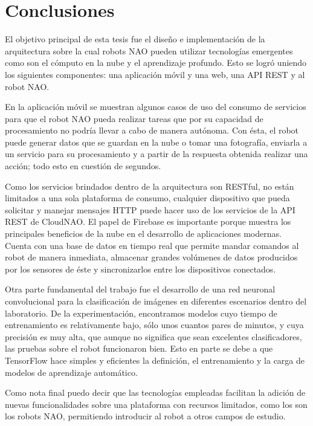 \chapter*{Conclusiones}
\label{\detokenize{conclusion:cloudnao-una-arquitectura-de-software-para-la-integracion-de-computo-en-la-nube-con-robots-nao}}\label{\detokenize{conclusion:conclusion}}\label{\detokenize{conclusion::doc}}


El objetivo principal de esta tesis fue el diseño e 
implementación de
la arquitectura sobre la cual robots NAO pueden
utilizar tecnologías emergentes como son el cómputo en la nube
y el aprendizaje 
profundo. Esto se logró uniendo los siguientes componentes:
una aplicación móvil y una web, una API REST y al robot NAO.

En la aplicación
móvil se muestran algunos casos de uso del consumo de
servicios para que el robot NAO pueda realizar tareas
que por su capacidad de procesamiento no podría 
llevar a cabo de manera autónoma.
Con ésta, el robot puede generar datos que
se guardan en la nube o tomar una fotografía,
enviarla a un servicio para su procesamiento y a partir
de la respuesta obtenida realizar una acción; todo
esto en cuestión de segundos.

Como los servicios brindados dentro de la arquitectura son 
RESTful, no están limitados a una sola plataforma
de consumo, cualquier dispositivo que pueda solicitar y
manejar mensajes HTTP puede hacer uso de los servicios
de la API REST de CloudNAO.
El papel de Firebase es importante porque muestra
los principales beneficios de la nube en el desarrollo
de aplicaciones modernas. Cuenta con una base de datos en tiempo
real que permite mandar comandos al robot de manera
inmediata, almacenar grandes volúmenes de datos
producidos por los sensores de éste y sincronizarlos entre los dispositivos
conectados.

Otra parte fundamental del trabajo fue el desarrollo
de una red neuronal convolucional para la clasificación
de imágenes en diferentes escenarios dentro del laboratorio.
De la experimentación, encontramos modelos
cuyo tiempo de entrenamiento es relativamente bajo, sólo unos 
cuantos pares de minutos, y cuya precisión es muy alta, que 
aunque no significa que sean excelentes clasificadores,
las pruebas sobre el robot funcionaron bien.
Esto en parte se debe a que
TensorFlow hace simples y eficientes
la definición, el entrenamiento y la carga de modelos de 
aprendizaje automático. 

Como nota final puedo decir que las tecnologías empleadas
facilitan la adición
de nuevas funcionalidades sobre una plataforma con recursos
limitados, como los son los robots NAO,
permitiendo introducir al robot a otros campos de estudio.
